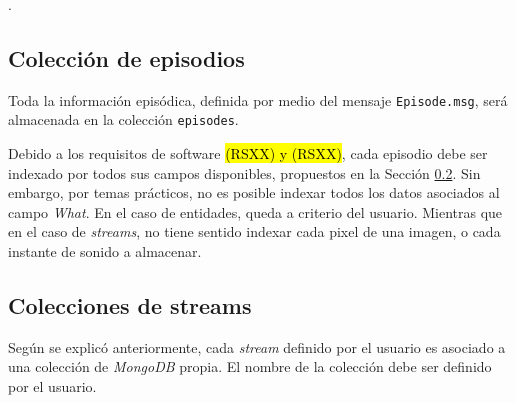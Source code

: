 .


\subsection{Colección de episodios}

Toda la información episódica, definida por medio del mensaje \texttt{Episode.msg}, será almacenada en la colección \texttt{episodes}.

Debido a los requisitos de software \hl{(RSXX) y (RSXX)}, cada episodio debe ser indexado por todos sus campos disponibles, propuestos en la Sección \ref{}. Sin embargo, por temas prácticos, no es posible indexar todos los datos asociados al campo \textit{What}. En el caso de entidades, queda a criterio del usuario. Mientras que en el caso de \textit{streams}, no tiene sentido indexar cada pixel de una imagen, o cada instante de sonido a almacenar.




\subsection{Colecciones de streams}

Según se explicó anteriormente, cada \textit{stream} definido por el usuario es asociado a una colección de \textit{MongoDB} propia. El nombre de la colección debe ser definido por el usuario. 

